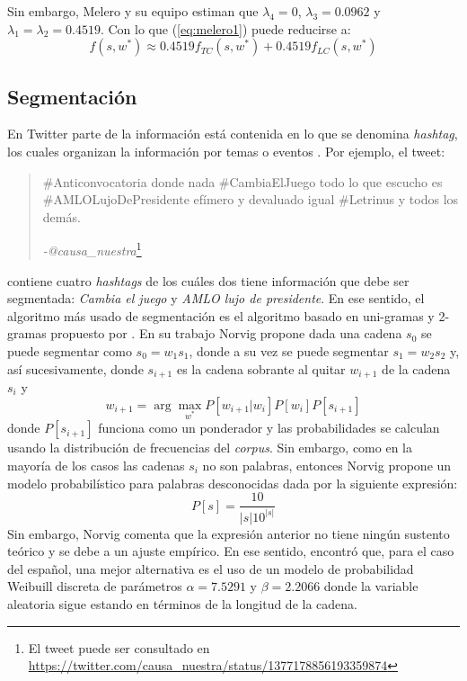 Sin embargo, Melero y su equipo estiman que $\lambda_4 = 0$, $\lambda_3 = 0.0962$ y $\lambda_1=\lambda_2 = 0.4519$. Con lo que (\ref{eq:melero1}) puede reducirse a:
\begin{equation}
	\label{eq:melero2}
	f(s,w^{*}) \approx 0.4519f_{TC}(s,w^{*}) + 0.4519f_{LC}(s,w^{*}) 
\end{equation}

\subsection{Segmentación}

En Twitter parte de la información está contenida en lo que se denomina \textit{hashtag}, los cuales organizan la información por temas o eventos \citep{small2011hashtag}. Por ejemplo, el tweet:

\begin{quotation}
	\#Anticonvocatoria donde nada \#CambiaElJuego todo lo que escucho es \#AMLOLujoDePresidente efímero y devaluado igual \#Letrinus y todos los demás.\\ \begin{flushright}
		\textit{-@causa\_nuestra}\footnote{El tweet puede ser consultado en \url{https://twitter.com/causa_nuestra/status/1377178856193359874}}
	\end{flushright}
\end{quotation}
contiene cuatro \textit{hashtags} de los cuáles dos tiene información que debe ser segmentada: \textit{Cambia el juego} y \textit{AMLO lujo de presidente}. En ese sentido, el algoritmo más usado de segmentación es el algoritmo basado en uni-gramas y 2-gramas propuesto por \cite{norvig209natural}. En su trabajo Norvig propone dada una cadena $s_0$ se puede segmentar como $s_0 = w_1s_1$, donde a su vez se puede segmentar $s_1 = w_2s_2$ y, así sucesivamente, donde $s_{i+1}$ es la cadena sobrante al quitar $w_{i+1}$ de la cadena $s_{i}$ y
\begin{equation}
	\label{eq:norvig}
	w_{i+1} = \arg\max_{w^{*}} P\left[w_{i+1} \vert w_{i}\right]P\left[w_{i}\right]P[s_{i+1}]
\end{equation}
donde $P[s_{i+1}]$ funciona como un ponderador y las probabilidades se calculan usando la distribución de frecuencias del \textit{corpus}. Sin embargo, como en la mayoría de los casos las cadenas $s_i$ no son palabras, entonces Norvig propone un modelo probabilístico para palabras desconocidas dada por la siguiente expresión:
\begin{equation}
	\label{eq:norvigunknown}
	P[s] = \frac{10}{\vert s \vert 10^{\vert s \vert}}
\end{equation}
Sin embargo, Norvig comenta que la expresión anterior no tiene ningún sustento teórico y se debe a un ajuste empírico. En ese sentido, \cite{cano2019segmentacion} encontró que, para el caso del español, una mejor alternativa es el uso de un modelo de probabilidad Weibuill discreta de parámetros $\alpha = 7.5291$ y $\beta = 2.2066$ donde la variable aleatoria sigue estando en términos de la longitud de la cadena.


